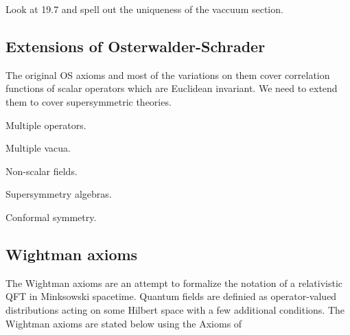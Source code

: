 \documentclass{article}
\newcommand{\1}{\mathbbm{1}}
\theoremstyle{plain}
\theoremstyle{definition}
\numberwithin{equation}{section}
\begin{document}
 Look at 19.7 and spell out the uniqueness of the vaccuum section. 



\subsection{Extensions of Osterwalder-Schrader}

The original OS axioms and most of the variations on them cover correlation functions of scalar operators which
are Euclidean invariant.  We need to extend them to cover supersymmetric theories.

Multiple operators.

Multiple vacua.

Non-scalar fields.

Supersymmetry algebras.

Conformal symmetry.

\subsection{Wightman axioms}\label{wightmanaxioms}

The Wightman axioms are an attempt to formalize the notation of a relativistic QFT in Minksowski spacetime. Quantum fields are definied as operator-valued distributions acting on some Hilbert space with a few additional conditions. The Wightman axioms are stated below using the Axioms of \cite{https://ncatlab.org/nlab/show/Wightman+axioms}
\end{document}
